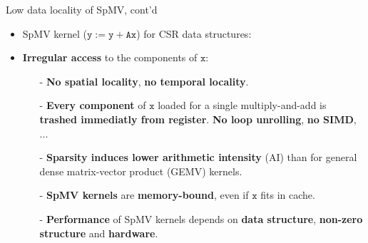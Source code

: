 \documentclass[t,usepdftitle=false]{beamer}
\begin{document}
\begin{frame}{Low data locality of SpMV, cont'd}
\begin{itemize}
\item SpMV kernel ($\texttt{y}:=\texttt{y}+\texttt{A}\texttt{x}$) for CSR data structures:\vspace{0cm}
\begin{center}\end{center}
\item \textbf{Irregular access} to the components of $\texttt{x}$:\vspace{.05cm}
\begin{itemize}\normalsize
\item[-] \textbf{No spatial locality}, \textbf{no temporal locality}.\vspace{.1cm}
\item[-] \textbf{Every component} of $\texttt{x}$ loaded for a single multiply-and-add is \textbf{trashed immediatly from register}. \textbf{No loop unrolling}, \textbf{no SIMD}, ...\vspace{.1cm}
\item[-] \textbf{Sparsity induces lower arithmetic intensity} (AI) than for general dense matrix-vector product (GEMV) kernels.\vspace{.1cm}
\item[-] \textbf{SpMV kernels} are \textbf{memory-bound}, even if $\texttt{x}$ fits in cache.\vspace{.1cm}
\item[-] \textbf{Performance} of SpMV kernels depends on \textbf{data structure}, \textbf{non-zero structure} and \textbf{hardware}.
\end{itemize}
\end{itemize}
\end{frame}
\end{document}
